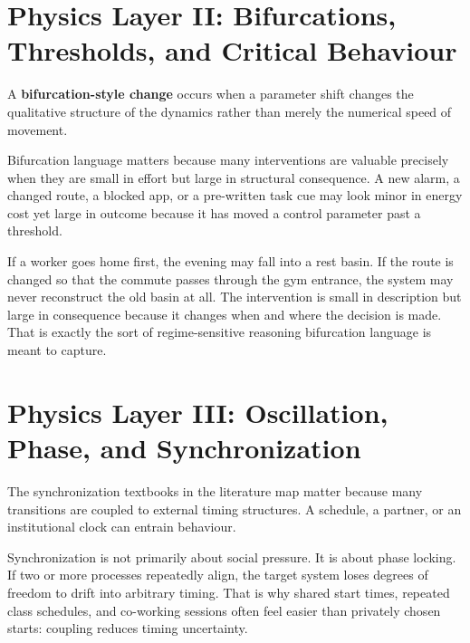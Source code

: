 \section{Physics Layer II: Bifurcations, Thresholds, and Critical Behaviour}

\begin{definition}
A \textbf{bifurcation-style change} occurs when a parameter shift changes the
qualitative structure of the dynamics rather than merely the numerical speed of
movement.
\end{definition}

Bifurcation language matters because many interventions are valuable precisely
when they are small in effort but large in structural consequence. A new alarm,
a changed route, a blocked app, or a pre-written task cue may look minor in
energy cost yet large in outcome because it has moved a control parameter past a
threshold.

\begin{example}
If a worker goes home first, the evening may fall into a rest basin. If the
route is changed so that the commute passes through the gym entrance, the
system may never reconstruct the old basin at all. The intervention is small in
description but large in consequence because it changes when and where the
decision is made. That is exactly the sort of regime-sensitive reasoning
bifurcation language is meant to capture.
\end{example}

\section{Physics Layer III: Oscillation, Phase, and Synchronization}

The synchronization textbooks in the literature map matter because many
transitions are coupled to external timing structures. A schedule, a partner,
or an institutional clock can entrain behaviour.

\begin{discussion}
Synchronization is not primarily about social pressure. It is about phase
locking. If two or more processes repeatedly align, the target system loses
degrees of freedom to drift into arbitrary timing. That is why shared start
times, repeated class schedules, and co-working sessions often feel easier than
privately chosen starts: coupling reduces timing uncertainty.
\end{discussion}

